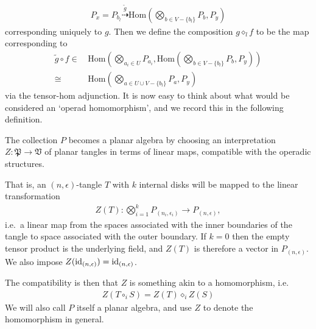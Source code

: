 \begin{align*}
P_x = P_{b_l}  \overset{\tilde{g}}{\dashrightarrow} \mathrm{Hom}\left( \bigotimes_{b\in V-\{b_l\}} P_b, P_y \right)
\end{align*}
corresponding uniquely to $g$. Then we define the composition $g\diamond_l f$ to be the map corresponding to
\begin{align*}
\tilde{g} \circ f \in& \,\mathrm{Hom}\left( \bigotimes_{a_i\in U} P_{a_i}, \mathrm{Hom}\left( \bigotimes_{b\in V-\{b_l\}} P_b, P_y  \right) \right)\\[2em]
\cong& \, \mathrm{Hom}\left(  \bigotimes_{a \in U\cup V-\{b_l\}} P_{a}, P_y\right)
\end{align*}
via the tensor-hom adjunction.
It is now easy to think about what would be considered an `operad homomorphism', and we record this in the following definition.
\begin{definition}\label{def:Planar Algebra}
The collection $P$ becomes a planar algebra by choosing an interpretation $Z:\mathfrak{P}\rightarrow\mathfrak{V}$ of planar tangles in terms of linear maps, compatible with the operadic structures.

That is, an $(n,\epsilon)$-tangle $T$ with $k$ internal disks will be mapped to the linear transformation
\begin{align*}
Z(T): \bigotimes_{i=1}^k P_{(n_i,\epsilon_i)} \rightarrow P_{(n,\epsilon)},
\end{align*}
i.e.\ a linear map from the spaces associated with the inner boundaries of the tangle to space associated with the outer boundary. If $k=0$ then the empty tensor product is the underlying field, and $Z(T)$ is therefore a vector in $P_{(n,\epsilon)}$. We also impose $Z(\operatorname{id}_{(n,\epsilon)}) = \operatorname{id}_{(n,\epsilon)}$.

The compatibility is then that $Z$ is something akin to a homomorphism, i.e.\
\begin{align*}
Z(T\circ_i S) = Z(T)\diamond_i Z(S)
\end{align*}
We will also call $P$ itself a planar algebra, and use $Z$ to denote the homomorphism in general.
\end{definition}

